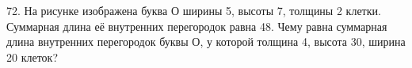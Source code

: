 72. На рисунке изображена буква О ширины 5, высоты 7, толщины 2 клетки. Суммарная длина её внутренних перегородок равна 48. Чему равна суммарная длина внутренних перегородок буквы О, у которой толщина 4, высота 30, ширина 20 клеток?
\begin{center}
\begin{figure}[ht!]
\end{figure}
\end{center}
